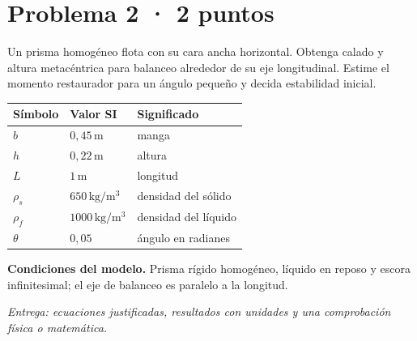 \par\medskip\noindent\begin{minipage}{\linewidth}

\section{Problema 2 · 2 puntos}

Un prisma homogéneo flota con su cara ancha horizontal. Obtenga calado y altura metacéntrica para balanceo alrededor de su eje longitudinal. Estime el momento restaurador para un ángulo pequeño y decida estabilidad inicial.

\begin{tabular}{@{}p{.15\linewidth}p{.23\linewidth}p{.54\linewidth}@{}}
\toprule Símbolo & Valor SI & Significado\\\midrule
$b$ & $0{,}45\,\mathrm{m}$ & manga\\
$h$ & $0{,}22\,\mathrm{m}$ & altura\\
$L$ & $1\,\mathrm{m}$ & longitud\\
$\rho_s$ & $650\,\mathrm{kg/m^3}$ & densidad del sólido\\
$\rho_f$ & $1000\,\mathrm{kg/m^3}$ & densidad del líquido\\
$\theta$ & $0{,}05$ & ángulo en radianes\\
\bottomrule\end{tabular}

\par\medskip\textbf{Condiciones del modelo.} Prisma rígido homogéneo, líquido en reposo y escora infinitesimal; el eje de balanceo es paralelo a la longitud.

\par\textit{Entrega: ecuaciones justificadas, resultados con unidades y una comprobación física o matemática.}

\end{minipage}\par\medskip

